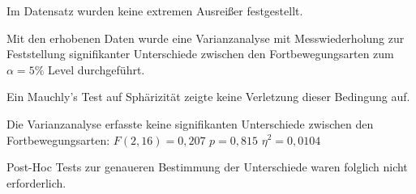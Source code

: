                     Im Datensatz wurden keine extremen Ausreißer %
                    festgestellt.

                    Mit den erhobenen Daten wurde eine Varianzanalyse mit Messwiederholung zur Feststellung signifikanter Unterschiede zwischen den Fortbewegungsarten zum $\alpha = 5\%$ Level durchgeführt.






                    Ein Mauchly's Test auf Sphärizität zeigte keine Verletzung dieser Bedingung auf.

                    Die Varianzanalyse erfasste keine signifikanten Unterschiede zwischen den Fortbewegungsarten: $F(2,16) = 0,207$  $p = 0,815$ $\eta^{2} = 0,0104$

                    Post-Hoc Tests zur genaueren Bestimmung der Unterschiede waren folglich nicht erforderlich.
%




%



